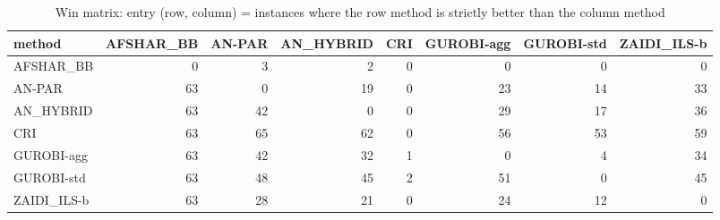 \begin{table}[htbp]
\centering
\small
\caption{Win matrix: entry (row, column) = instances where the row method is strictly better than the column method}
\label{tab:E10b_state_of_the_art_60s_b60_wins}
\begin{tabular}{lrrrrrrr}
\toprule
method & AFSHAR\_BB & AN-PAR & AN\_HYBRID & CRI & GUROBI-agg & GUROBI-std & ZAIDI\_ILS-b \\
\midrule
AFSHAR\_BB & 0 & 3 & 2 & 0 & 0 & 0 & 0 \\
AN-PAR & 63 & 0 & 19 & 0 & 23 & 14 & 33 \\
AN\_HYBRID & 63 & 42 & 0 & 0 & 29 & 17 & 36 \\
CRI & 63 & 65 & 62 & 0 & 56 & 53 & 59 \\
GUROBI-agg & 63 & 42 & 32 & 1 & 0 & 4 & 34 \\
GUROBI-std & 63 & 48 & 45 & 2 & 51 & 0 & 45 \\
ZAIDI\_ILS-b & 63 & 28 & 21 & 0 & 24 & 12 & 0 \\
\bottomrule
\end{tabular}
\end{table}
